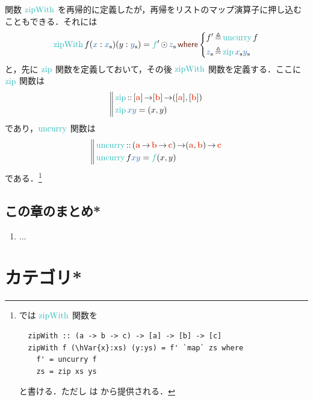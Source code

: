 \documentclass[a5paper,twoside,fleqn,draft]{jsbook}
\begin{document}
関数 $\mZipWith$ を再帰的に定義したが，再帰をリストのマップ演算子に押し込むこともできる．それには
\begin{equation}
  \mZipWith f(\hVar{x}:\mList{x})(y:\mList{y})
  =\hFunc{f}'\mMapList\mList{z}
  \mWhere
  \left\{
  \begin{aligned}
    f'
    &\mLetEq\mUncurry f\\
    \mList{z}
    &\mLetEq\mZipFunc\mList{x}\mList{y}
  \end{aligned}
  \right.
\end{equation}
と，先に $\mZipFunc$ 関数を定義しておいて，その後 $\mZipWith$ 関数を定義する．ここに $\mZipFunc$ 関数は
\begin{equation}
  \left\mBrace
  \begin{aligned}
    {}&\mZipFunc\mIn{}\mProjEXP{[\mA]}
    {\mProjEXP{[\mB]}
      {([\mA],[\mB])}}\\
    {}&\mZipFunc \hVar{x}\hVar{y}=(x,y)
  \end{aligned}
  \right.
\end{equation}
であり，$\mUncurry$ 関数は
\begin{equation}
  \left\mBrace
  \begin{aligned}
    {}&\mUncurry\mIn{}
    \mProjEXP{(\mProjEXP{\mA }{\mProjEXP{\mB }{\mC }})}
          {\mProjEXP{(\mA ,\mB )}{\mC }}\\
          {}&\mUncurry f\hVar{x}\hVar{y}=\hFunc{f}(x,y)
  \end{aligned}
  \right.
\end{equation}
である．\footnote{\haskell では $\mZipWith$ 関数を
\begin{verbatim}
  zipWith :: (a -> b -> c) -> [a] -> [b] -> [c]
  zipWith f (\hVar{x}:xs) (y:ys) = f' `map` zs where
    f' = uncurry f
    zs = zip xs ys
\end{verbatim}
と書ける．ただし  は  から提供される．}


\section{この章のまとめ*}

\begin{enumerate}
\item ...
\end{enumerate}

\chapter{カテゴリ*}
\label{ch:category}
\end{document}
